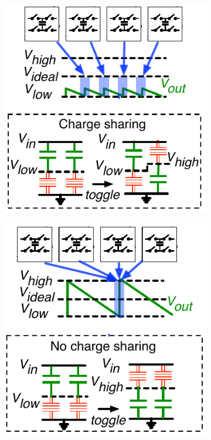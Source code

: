 \documentclass[graybox]{svmult}
\begin{document}
\begin{figure}
  \centering
  \hspace*{\fill}
  \begin{subfigure}[t]{0.42\textwidth}
  \centering
  \includegraphics[width=\textwidth]{3-simultaneous-switching-a}
  \caption{}
  \label{fig:3-simultaneous-switching-a}
  \end{subfigure}
  \hspace*{\fill}
  \begin{subfigure}[t]{0.42\textwidth}
  \centering
  \includegraphics[width=\textwidth]{3-simultaneous-switching-b}

\end{subfigure}
\end{figure}
\end{document}
